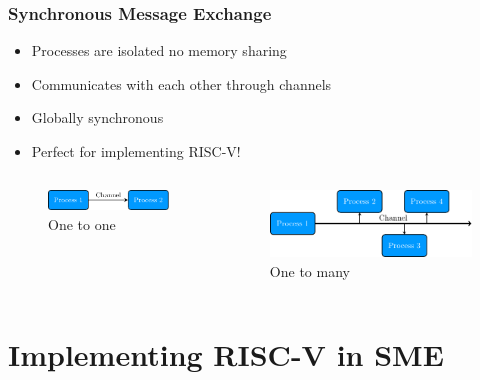 \documentclass{beamer}
\begin{document}
    \begin{frame}
        \frametitle{Synchronous Message Exchange}
        
        \begin{itemize}
            \item Processes are isolated no memory sharing
            \item Communicates with each other through channels
            \item Globally synchronous
            \item Perfect for implementing RISC-V!
        \end{itemize}
    
        \begin{columns}[T] 
            \begin{column}[T]{5cm}
                \centering
                \begin{figure}
                    \includegraphics[scale=0.6]{"Pictures and plots/one_to_one"}
                    \caption{One to one}
                \end{figure} 
            \end{column}
            \begin{column}[T]{5cm} 
                \begin{figure}
                    \includegraphics[scale=0.5]{"Pictures and plots/one_to_many"}
                    \caption{One to many}
                \end{figure} 
            \end{column}
        \end{columns}
        
    \end{frame}

    \section{Implementing RISC-V in SME}
\end{document}
